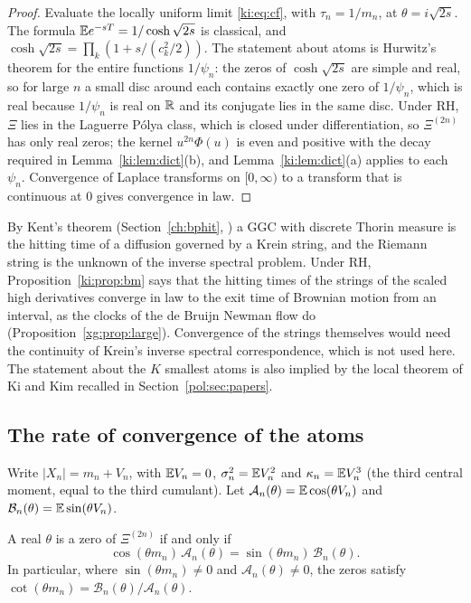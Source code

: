 \begin{proof}
Evaluate the locally uniform limit \eqref{ki:eq:cf}, with $\tau_n=1/m_n$, at $\theta=i\sqrt{2s}$. The formula $\mathbb{E} e^{-sT}=1/\cosh\sqrt{2s}$ is classical, and $\cosh\sqrt{2s}=\prod_k(1+s/(c_k^2/2))$. The statement about atoms is Hurwitz's theorem for the entire functions $1/\psi_n$: the zeros of $\cosh\sqrt{2s}$ are simple and real, so for large $n$ a small disc around each contains exactly one zero of $1/\psi_n$, which is real because $1/\psi_n$ is real on $\mathbb{R}$ and its conjugate lies in the same disc. Under RH, $\Xi$ lies in the Laguerre P\'olya class, which is closed under differentiation, so $\Xi^{(2n)}$ has only real zeros; the kernel $u^{2n}\Phi(u)$ is even and positive with the decay required in Lemma~\ref{ki:lem:dict}(b), and Lemma~\ref{ki:lem:dict}(a) applies to each $\psi_n$. Convergence of Laplace transforms on $[0,\infty)$ to a transform that is continuous at $0$ gives convergence in law.
\end{proof}

By Kent's theorem (Section~\ref{ch:bphit}, \cite{Kent80}) a GGC with discrete Thorin measure is the hitting time of a diffusion governed by a Krein string, and the Riemann string is the unknown of the inverse spectral problem. Under RH, Proposition~\ref{ki:prop:bm} says that the hitting times of the strings of the scaled high derivatives converge in law to the exit time of Brownian motion from an interval, as the clocks of the de Bruijn Newman flow do (Proposition~\ref{xg:prop:large}). Convergence of the strings themselves would need the continuity of Krein's inverse spectral correspondence, which is not used here. The statement about the $K$ smallest atoms is also implied by the local theorem of Ki and Kim recalled in Section~\ref{pol:sec:papers}.

\subsection{The rate of convergence of the atoms}\label{ki:sec:rate}

Write $|X_n|=m_n+V_n$, with $\mathbb{E} V_n=0$, $\sigma_n^2=\mathbb{E} V_n^2$ and $\kappa_n=\mathbb{E} V_n^3$ (the third central moment, equal to the third cumulant). Let $\mathcal A_n(\theta)=\mathbb{E}\cos(\theta V_n)$ and $\mathcal B_n(\theta)=\mathbb{E}\sin(\theta V_n)$.

\begin{lemma}\label{ki:lem:zeroeq}
A real $\theta$ is a zero of $\Xi^{(2n)}$ if and only if
\[
\cos(\theta m_n)\,\mathcal A_n(\theta)=\sin(\theta m_n)\,\mathcal B_n(\theta).
\]
In particular, where $\sin(\theta m_n)\ne0$ and $\mathcal A_n(\theta)\ne0$, the zeros satisfy $\cot(\theta m_n)=\mathcal B_n(\theta)/\mathcal A_n(\theta)$.
\end{lemma}

